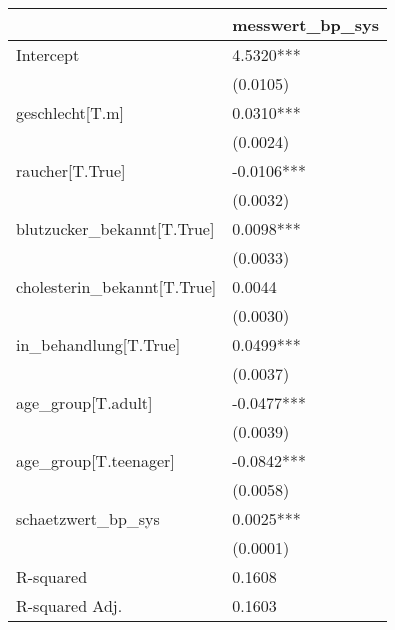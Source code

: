 \begin{tabular}{ll}
\toprule
{} & messwert\_bp\_sys \\
\midrule
Intercept                   &       4.5320*** \\
                            &        (0.0105) \\
geschlecht[T.m]             &       0.0310*** \\
                            &        (0.0024) \\
raucher[T.True]             &      -0.0106*** \\
                            &        (0.0032) \\
blutzucker\_bekannt[T.True]  &       0.0098*** \\
                            &        (0.0033) \\
cholesterin\_bekannt[T.True] &          0.0044 \\
                            &        (0.0030) \\
in\_behandlung[T.True]       &       0.0499*** \\
                            &        (0.0037) \\
age\_group[T.adult]          &      -0.0477*** \\
                            &        (0.0039) \\
age\_group[T.teenager]       &      -0.0842*** \\
                            &        (0.0058) \\
schaetzwert\_bp\_sys          &       0.0025*** \\
                            &        (0.0001) \\
R-squared                   &          0.1608 \\
R-squared Adj.              &          0.1603 \\
\bottomrule
\end{tabular}
